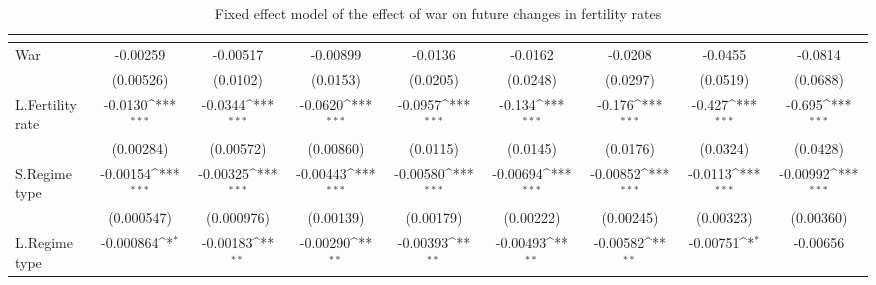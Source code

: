 \begin{table}[htbp]\centering
\def\sym#1{\ifmmode^{#1}\else\(^{#1}\)\fi}
\caption{Fixed effect model of the effect of war on future changes in fertility rates\label{fefertility}}
\begin{tabular}{l*{8}{c}}
\hline\hline
                    &&&&&&&&\\
\hline
War                 &    -0.00259         &    -0.00517         &    -0.00899         &     -0.0136         &     -0.0162         &     -0.0208         &     -0.0455         &     -0.0814         \\
                    &   (0.00526)         &    (0.0102)         &    (0.0153)         &    (0.0205)         &    (0.0248)         &    (0.0297)         &    (0.0519)         &    (0.0688)         \\
[1em]
L.Fertility rate    &     -0.0130\sym{***}&     -0.0344\sym{***}&     -0.0620\sym{***}&     -0.0957\sym{***}&      -0.134\sym{***}&      -0.176\sym{***}&      -0.427\sym{***}&      -0.695\sym{***}\\
                    &   (0.00284)         &   (0.00572)         &   (0.00860)         &    (0.0115)         &    (0.0145)         &    (0.0176)         &    (0.0324)         &    (0.0428)         \\
[1em]
S.Regime type       &    -0.00154\sym{***}&    -0.00325\sym{***}&    -0.00443\sym{***}&    -0.00580\sym{***}&    -0.00694\sym{***}&    -0.00852\sym{***}&     -0.0113\sym{***}&    -0.00992\sym{***}\\
                    &  (0.000547)         &  (0.000976)         &   (0.00139)         &   (0.00179)         &   (0.00222)         &   (0.00245)         &   (0.00323)         &   (0.00360)         \\
[1em]
L.Regime type       &   -0.000864\sym{*}  &    -0.00183\sym{**} &    -0.00290\sym{**} &    -0.00393\sym{**} &    -0.00493\sym{**} &    -0.00582\sym{**} &    -0.00751\sym{*}  &    -0.00656         \\

\end{tabular}
\end{table}
